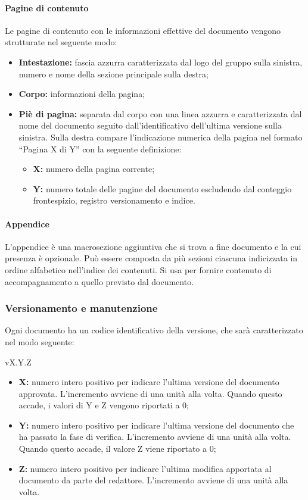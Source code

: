 \paragraph{Pagine di contenuto}
Le pagine di contenuto con le informazioni effettive del documento vengono strutturate nel seguente modo:

\begin{itemize}
	\item \textbf{Intestazione:} fascia azzurra caratterizzata dal logo del gruppo sulla sinistra, numero e nome della sezione principale sulla destra;
	\item \textbf{Corpo:} informazioni della pagina;
	\item \textbf{Piè di pagina:} separata dal corpo con una linea azzurra e caratterizzata dal nome del documento seguito dall’identificativo dell’ultima versione sulla sinistra. Sulla destra compare l’indicazione numerica della pagina nel formato “Pagina X di Y” con la seguente definizione:
	\begin{itemize}
		\item \textbf{X:} numero della pagina corrente;
		\item \textbf{Y:} numero totale delle pagine del documento escludendo dal conteggio frontespizio, registro versionamento e indice.
	\end{itemize}
\end{itemize}

\paragraph{Appendice}
L'appendice è una macrosezione aggiuntiva che si trova a fine documento e la cui presenza è opzionale. Può essere composta da più sezioni ciascuna indicizzata in ordine alfabetico nell'indice dei contenuti. Si usa per fornire contenuto di accompagnamento a quello previsto dal documento.


\subsubsection{Versionamento e manutenzione}
Ogni documento ha un codice identificativo della versione, che sarà caratterizzato nel modo seguente:
\begin{center}
	vX.Y.Z
\end{center}

\begin{itemize}
	\item \textbf{X:} numero intero positivo per indicare l’ultima versione del documento approvata. L’incremento avviene di una unità alla volta. Quando questo accade, i valori di Y e Z vengono riportati a 0;
	\item \textbf{Y:} numero intero positivo per indicare l’ultima versione del documento che ha passato la fase di verifica. L’incremento avviene di una unità alla volta. Quando questo accade, il valore Z viene riportato a 0;
	\item \textbf{Z:} numero intero positivo per indicare l’ultima modifica apportata al documento da parte del redattore. L’incremento avviene di una unità alla volta.
\end{itemize}

